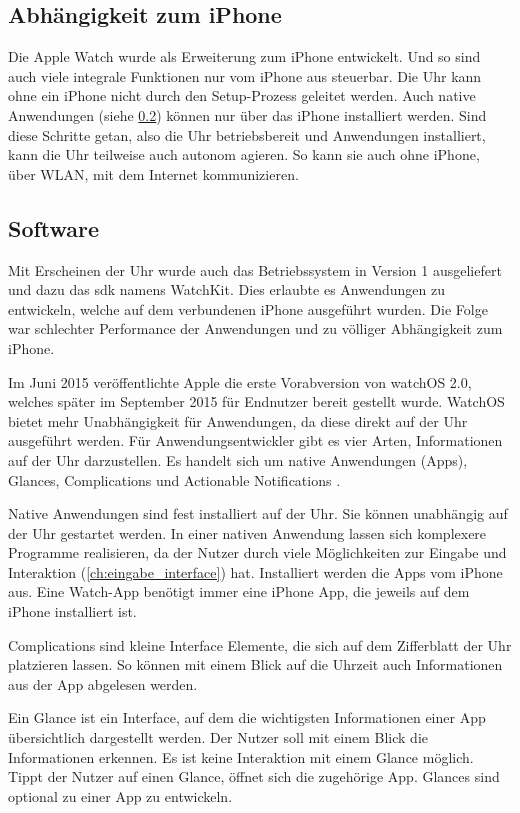 \subsection{Abhängigkeit zum iPhone}
Die Apple Watch wurde als Erweiterung zum iPhone entwickelt. Und so sind auch viele integrale Funktionen nur vom iPhone aus steuerbar. Die Uhr kann ohne ein iPhone nicht durch den Setup-Prozess geleitet werden. Auch native Anwendungen (siehe \ref{ch:watch_software}) können nur über das iPhone installiert werden. Sind diese Schritte getan, also die Uhr betriebsbereit und Anwendungen installiert, kann die Uhr teilweise auch autonom agieren. So kann sie auch ohne iPhone, über WLAN, mit dem Internet kommunizieren.

\subsection{Software}
\label{ch:watch_software}
Mit Erscheinen der Uhr wurde auch das Betriebssystem in Version 1 ausgeliefert und dazu das \gls{sdk} namens WatchKit. Dies erlaubte es Anwendungen zu entwickeln, welche auf dem verbundenen iPhone ausgeführt wurden. Die Folge war schlechter Performance der Anwendungen und zu völliger Abhängigkeit zum iPhone.

Im Juni 2015 veröffentlichte Apple die erste Vorabversion von watchOS 2.0, welches später im September 2015 für Endnutzer bereit gestellt wurde. WatchOS bietet mehr Unabhängigkeit für Anwendungen, da diese direkt auf der Uhr ausgeführt werden. Für Anwendungsentwickler gibt es vier Arten, Informationen auf der Uhr darzustellen. Es handelt sich um native Anwendungen (Apps), Glances, Complications und Actionable Notifications \cite{Apple:2015devAw}.

Native Anwendungen sind fest installiert auf der Uhr. Sie können unabhängig auf der Uhr gestartet werden. In einer nativen Anwendung lassen sich komplexere Programme realisieren, da der Nutzer durch viele Möglichkeiten zur Eingabe und Interaktion (\ref{ch:eingabe_interface}) hat. Installiert werden die Apps vom iPhone aus. Eine Watch-App benötigt immer eine iPhone App, die jeweils auf dem iPhone installiert ist.

Complications sind kleine Interface Elemente, die sich auf dem Zifferblatt der Uhr platzieren lassen. So können mit einem Blick auf die Uhrzeit auch Informationen aus der App abgelesen werden.

Ein Glance ist ein Interface, auf dem die wichtigsten Informationen einer App übersichtlich dargestellt werden. Der Nutzer soll mit einem Blick die Informationen erkennen. Es ist keine Interaktion mit einem Glance möglich. Tippt der Nutzer auf einen Glance, öffnet sich die zugehörige App. Glances sind optional zu einer App zu entwickeln.

